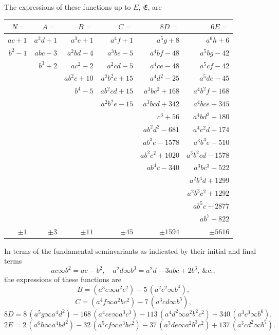 \documentclass[11pt]{article}
\begin{document}
The expressions of these functions up to $E$, $\mathfrak{E}$, are
\begin{center}
\begin{tabular}{rrrrrr}
\hline
$N=$ & $A=$ & $B=$ & $C=$ & $8D=$ & $6E=$ \\
\hline
$a c + 1$ & $a^2 d + 1$ & $a^3 e + 1$ & $a^4 f + 1$ & $a^5 g + 8$ & $a^6 h + 6$ \\
$b^2 - 1$ & $a b c - 3$ & $a^2 b d - 4$ & $a^3 b e - 5$ & $a^4 b f - 48$ & $a^5 b g - 42$ \\
 & $b^3 + 2$ & $a c^2 - 2$ & $a^2 c d - 5$ & $a^4 c e - 48$ & $a^5 c f - 42$ \\
 & & $a b^2 c + 10$ & $a^2 b^2 e + 15$ & $a^4 d^2 - 25$ & $a^5 d e - 45$ \\
 & & $b^4 - 5$ & $a b^2 c d + 15$ & $a^3 b c^2 + 168$ & $a^4 b^2 f + 168$ \\
 & & & $a^2 b^2 e - 15$ & $a^3 b c d + 342$ & $a^4 b c e + 345$ \\
 & & & & $c^3 + 56$ & $a^4 b d^2 + 180$ \\
 & & & & $a b^2 d^2 - 681$ & $a^4 c^2 d + 174$ \\
 & & & & $a b^3 e - 1578$ & $a^3 b^3 e - 510$ \\
 & & & & $a b^2 c^2 + 1020$ & $a^3 b^2 c d - 1578$ \\
 & & & & $a b^4 c - 340$ & $a^3 b c^3 - 522$ \\
 & & & & & $a^2 b^4 d + 1299$ \\
 & & & & & $a^2 b^3 c^2 + 1292$ \\
 & & & & & $a b^5 c - 2877$ \\
 & & & & & $a b^7 + 822$ \\
\hline
$\pm 1$ & $\pm 3$ & $\pm 11$ & $\pm 45$ & $\pm 1594$ & $\pm 5616$ \\
\hline
\end{tabular}
\end{center}

In terms of the fundamental seminvariants as indicated by their initial and final terms
\[
a c \infty b^2 = a c - b^2,\quad a^2 d \infty b^3 = a^2 d - 3 a b c + 2 b^3,\ \&\mathrm{c}.,
\]
the expressions of these functions are
\[
B = (a^3 e \infty a^2 c^2) - 5\,(a^2 c^2 \infty b^4),
\]
\[
C = (a^4 f \infty a^2 b c^2) - 7\,(a^3 c d \infty b^5),
\]
\[
8D = 8\,(a^5 g \infty a^4 d^2) - 168\,(a^4 c e \infty a^3 c^3) - 113\,(a^4 d^2 \infty a^2 b^2 c^2) + 340\,(a^3 c^3 \infty b^6),
\]
\[
2E = 2\,(a^6 h \infty a^4 b d^2) - 32\,(a^5 c f \infty a^3 b c^2) - 37\,(a^5 d e \infty a^2 b^3 c^2) + 137\,(a^3 c d^2 \infty b^7).
\]
\end{document}
